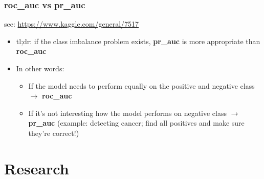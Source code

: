 \documentclass[12pt,a4paper]{article}
\begin{document}
\subsubsection{roc\_auc vs pr\_auc}
see: \url{https://www.kaggle.com/general/7517}
\begin{itemize}
\item tl;dr: if the class imbalance problem exists, \textbf{pr\_auc} is more appropriate than \textbf{roc\_auc}
\item In other words: 
\begin{itemize}
\item If the model needs to perform equally on the positive and negative class $\rightarrow$ \textbf{roc\_auc}
\item If it's not interesting how the model performs on negative class $\rightarrow$ \textbf{pr\_auc} (example: detecting cancer; find all positives and make sure they're correct!)
\end{itemize}
\end{itemize}
\section{Research}
\end{document}
